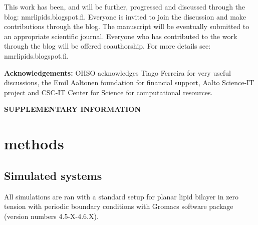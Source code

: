 \documentclass[pre,aps,floatfix,authordate1-4,twocolumn]{revtex4-1}
\begin{document}

This work has been, and will be further, progressed and discussed through the blog: nmrlipids.blogspot.fi. 
Everyone is invited to join the discussion and make contributions through the blog. 
The manuscript will be eventually submitted to an appropriate scientific journal. 
Everyone who has contributed to the work through the blog will be offered 
coauthorship. For more details see: nmrlipids.blogspot.fi.   

{\bf Acknowledgements: }
OHSO acknowledges Tiago Ferreira for very useful discussions, the Emil Aaltonen foundation for financial support, Aalto Science-IT project and CSC-IT Center for Science for computational resources. 


\newpage

\appendix
\begin{center}
{\bf SUPPLEMENTARY INFORMATION}
\end{center}

\section{methods}

\subsection{Simulated systems}
All simulations are ran with a standard setup for planar lipid bilayer in zero tension
with periodic boundary conditions with Gromacs software package (version numbers 4.5-X-4.6.X).

\end{document}
